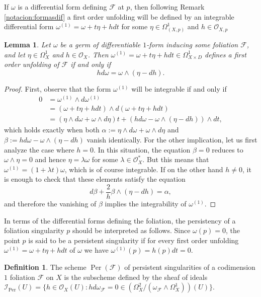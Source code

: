 \documentclass[reqno]{amsart}
\theoremstyle{plain}
\newcommand{\I}{\mathcal{I}}
\newcommand{\OO}{\mathcal{O}}
\renewcommand{\I}{\mathcal{I}}
\newcommand{\F}{\mathscr{F}}
\DeclareMathOperator{\Per}{Per}
\newtheorem{lemma}[theorem]{Lemma}
\theoremstyle{definition}
\newtheorem{definition}[theorem]{Definition}
\theoremstyle{named}
\begin{document}
If $\omega$ is a differential form defining $\F$ at $p$, then following Remark \ref{notacion:formasdif} a first order unfolding will be defined by an integrable differential form $\omega^{(1)}=\omega +t \eta + h dt$ for some $\eta\in\Omega^1_{(X,p)}$ and $h\in\OO_{X,p}$ 

\begin{lemma}\label{eq:unfolding}
    Let $\omega$ be a germ of differentiable $1$-form inducing some foliation $\F$, and let $\eta\in \Omega^1_X$ and $h\in\OO_X$. Then $\omega^{(1)}=\omega+t\eta+hdt\in \Omega^1_{X\times D}$ defines a first order unfolding of $\F$ if and only if 
    $$hd\omega=\omega\wedge(\eta-dh).$$
\end{lemma}
\begin{proof}
First, observe that the form $\omega^{(1)}$ will be integrable if and only if
\begin{align*}
    0&=\omega^{(1)}\wedge d\omega^{(1)}\\
    &=(\omega+t\eta+hdt)\wedge d(\omega+t\eta+hdt)\\
    &=(\eta\wedge d\omega+\omega\wedge d\eta) t + (hd\omega-\omega\wedge(\eta-dh))\wedge dt,
\end{align*}
which holds exactly when both $\alpha:=\eta\wedge d\omega+\omega\wedge d\eta$ and $\beta:=hd\omega-\omega\wedge(\eta-dh)$ vanish identically. For the other implication, let us first analyze the case where $h=0$. In this situation, the equation $\beta=0$ reduces to $\omega\wedge\eta=0$ and hence $\eta=\lambda \omega$ for some $\lambda\in\OO_X^*$. But this means that $\omega^{(1)}=(1+\lambda t)\omega$, which is of course integrable. If on the other hand $h\neq 0$, it is enough to check that these elements satisfy the equation
$$ d\beta+\frac{2}{h}\beta\wedge(\eta-dh)=\alpha,$$
and therefore the vanishing of $\beta$ implies the integrability of $\omega^{(1)}$.
\end{proof}

In terms of the differential forms defining the foliation, the persistency of a foliation singularity $p$ should be interpreted as follows. 
Since $\omega(p)=0$, the point $p$ is said to be a persistent singularity if for every first order unfolding $\omega^{(1)}=\omega+t \eta+hdt$ of $\omega$ we have $\omega^{(1)}(p)=h(p)dt=0$. 


\begin{definition}\label{def:Iper}
    The scheme $\Per(\F)$ of persistent singularities of a codimension $1$ foliation $\F$ on $X$ is the subscheme defined by the sheaf of ideals 
    $\I_{\Per}(U)=\{h\in \OO_X(U) : hd\omega_\F=0\in \left(\Omega^2_X/( \omega_\F \wedge \Omega^1_X) \right)(U)\}.$
\end{definition}
\end{document}
